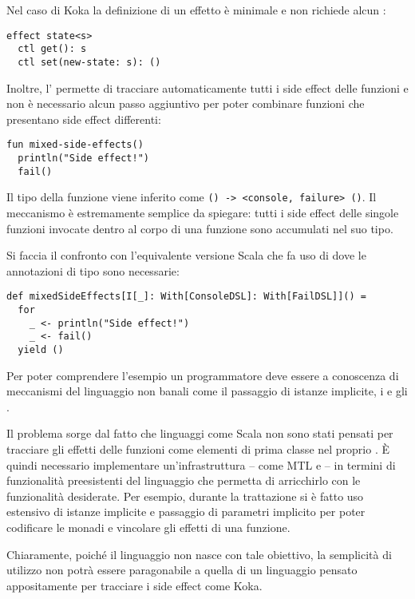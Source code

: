 Nel caso di Koka la definizione di un effetto è minimale e non richiede alcun :
\begin{lstlisting}[language=koka]
effect state<s>
  ctl get(): s
  ctl set(new-state: s): ()
\end{lstlisting}
Inoltre, l' permette di tracciare automaticamente tutti i side effect delle funzioni e non è necessario alcun passo aggiuntivo per poter combinare funzioni che presentano side effect differenti:
\begin{lstlisting}[language=koka]
fun mixed-side-effects()
  println("Side effect!")
  fail()
\end{lstlisting}
Il tipo della funzione viene inferito come \lstinline{() -> <console, failure> ()}. Il meccanismo è estremamente semplice da spiegare: tutti i side effect delle singole funzioni invocate dentro al corpo di una funzione sono accumulati nel suo tipo.

Si faccia il confronto con l'equivalente versione Scala che fa uso di  dove le annotazioni di tipo sono necessarie:
\begin{lstlisting}[language=scala3]
def mixedSideEffects[I[_]: With[ConsoleDSL]: With[FailDSL]]() =
  for
    _ <- println("Side effect!")
    _ <- fail()
  yield ()
\end{lstlisting}
Per poter comprendere l'esempio un programmatore deve essere a conoscenza di meccanismi del linguaggio non banali come il passaggio di istanze implicite, i  e gli .

Il problema sorge dal fatto che linguaggi come Scala non sono stati pensati per tracciare gli effetti delle funzioni come elementi di prima classe nel proprio .
È quindi necessario implementare un'infrastruttura -- come MTL e  -- in termini di funzionalità preesistenti del linguaggio che permetta di arricchirlo con le funzionalità desiderate.
Per esempio, durante la trattazione si è fatto uso estensivo di istanze implicite e passaggio di parametri implicito per poter codificare le monadi e vincolare gli effetti di una funzione.

Chiaramente, poiché il linguaggio non nasce con tale obiettivo, la semplicità di utilizzo non potrà essere paragonabile a quella di un linguaggio pensato appositamente per tracciare i side effect come Koka.

